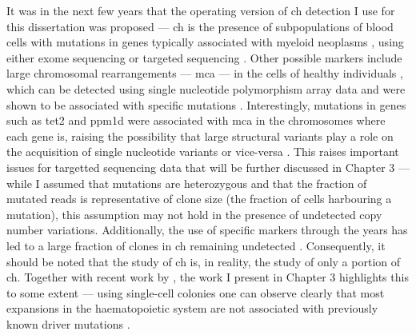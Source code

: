 It was in the next few years that the operating version of \ac{ch} detection I use for this dissertation was proposed --- \ac{ch} is the presence of subpopulations of blood cells with mutations in genes typically associated with myeloid neoplasms \cite{Jaiswal2014-rl,Genovese2014-eu,Xie2014-np,McKerrell2015-rl}, using either exome sequencing \cite{Xie2014-np,Jaiswal2014-rl,Genovese2014-eu} or targeted sequencing \cite{McKerrell2015-rl}. Other possible markers include large chromosomal rearrangements --- \ac{mca} --- in the cells of healthy individuals \cite{Jacobs2012-cj,Laurie2012-fc,Loh2018-xp,Gao2021-ph}, which can be detected using single nucleotide polymorphism array data and were shown to be associated with specific mutations \cite{Loh2018-xp,Gao2021-ph}. Interestingly, mutations in genes such as \ac{tet2} and \ac{ppm1d} were associated with \ac{mca} in the chromosomes where each gene is, raising the possibility that large structural variants play a role on the acquisition of single nucleotide variants or vice-versa \cite{Gao2021-ph}. This raises important issues for targetted sequencing data that will be further discussed in Chapter 3 --- while I assumed that mutations are heterozygous and that the fraction of mutated reads is representative of clone size (the fraction of cells harbouring a mutation), this assumption may not hold in the presence of undetected copy number variations. Additionally, the use of specific markers through the years has led to a large fraction of clones in \ac{ch} remaining undetected \cite{Poon2020-hl,Genovese2014-eu,Zink2017-zi}. Consequently, it should be noted that the study of \ac{ch} is, in reality, the study of only a portion of \ac{ch}. Together with recent work by , the work I present in Chapter 3 highlights this to some extent --- using single-cell colonies one can observe clearly that most expansions in the haematopoietic system are not associated with previously known driver mutations \cite{Fabre2021-uw,Mitchell2021-zl}. 

